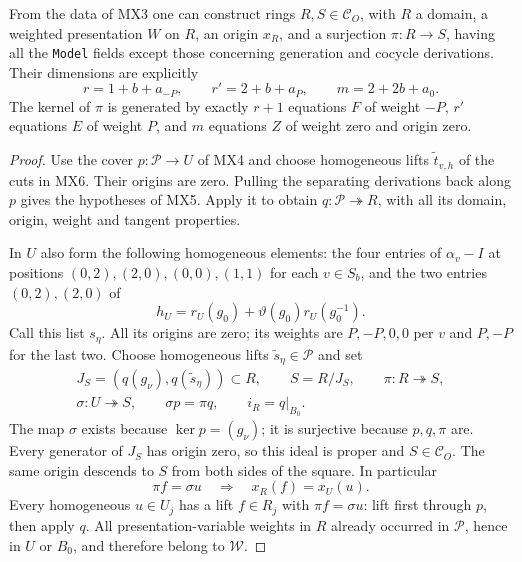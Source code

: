 \begin{proposition}
\label{claim:MX7}
From the data of MX3 one can construct rings $R,S\in\mathcal C_O$,
with $R$ a domain, a weighted presentation $W$ on $R$,
an origin $x_R$, and a surjection $\pi:R\to S$, having
all the \texttt{Model} fields except those concerning
generation and cocycle derivations.
Their dimensions are explicitly
\[
 r=1+b+a_{-P},\qquad r'=2+b+a_P,\qquad
                         m=2+2b+a_0.
 \tag{MX.27}
\]
The kernel of $\pi$ is generated by exactly $r+1$
equations $F$ of weight $-P$, $r'$ equations $E$ of
weight $P$, and $m$ equations $Z$ of weight zero and
origin zero.
\end{proposition}
\begin{proof}
Use the cover $p:\mathcal P\to U$ of MX4 and choose
homogeneous lifts $\widetilde t_{v,h}$ of the cuts in
MX6.  Their origins are zero.  Pulling the separating
derivations back along $p$ gives the hypotheses of MX5.
Apply it to obtain $q:\mathcal P\twoheadrightarrow R$,
with all its domain, origin, weight and tangent properties.

In $U$ also form the following homogeneous elements:
the four entries of $\alpha_v-I$ at positions
$(0,2),(2,0),(0,0),(1,1)$ for each $v\in S_b$,
and the two entries $(0,2),(2,0)$ of
\[
                 h_U=r_U(g_0)+\vartheta(g_0)r_U(g_0^{-1}).
 \tag{MX.28}
\]
Call this list $s_\eta$.  All its origins are zero;
its weights are $P,-P,0,0$ per $v$ and $P,-P$ for
the last two.  Choose homogeneous lifts
$\widetilde s_\eta\in\mathcal P$ and set
\[
 \begin{gathered}
 J_S=(q(g_\nu),q(\widetilde s_\eta))\subset R,
 \qquad S=R/J_S,\qquad\pi:R\twoheadrightarrow S,\\
 \sigma:U\twoheadrightarrow S,
 \qquad \sigma p=\pi q,
 \qquad i_R=q|_{B_0}.
 \end{gathered}
 \tag{MX.29}
\]
The map $\sigma$ exists because $\ker p=(g_\nu)$;
it is surjective because $p,q,\pi$ are.
Every generator of $J_S$ has origin zero, so this ideal
is proper and $S\in\mathcal C_O$.
The same origin descends to $S$ from both sides of
the square.  In particular
\[
 \pi f=\sigma u\quad\Longrightarrow\quad
                            x_R(f)=x_U(u).
 \tag{MX.30}
\]
Every homogeneous $u\in U_j$ has a lift $f\in R_j$
with $\pi f=\sigma u$: lift first through $p$, then
apply $q$.  All presentation-variable weights in $R$
already occurred in $\mathcal P$, hence in $U$ or
$B_0$, and therefore belong to $\mathcal W$.


\end{proof}
